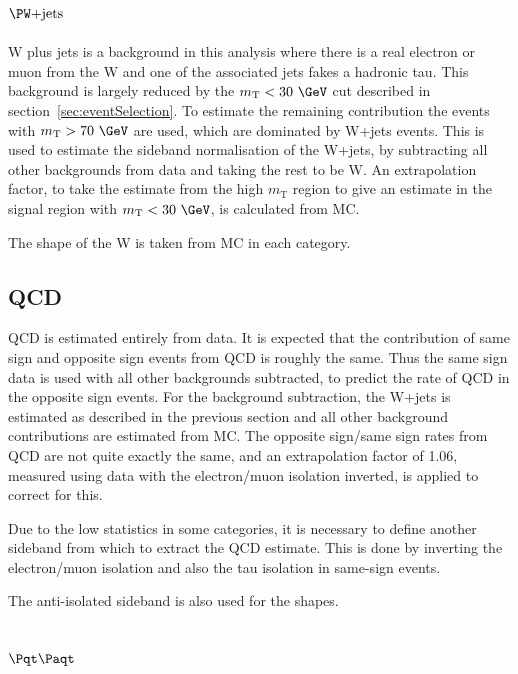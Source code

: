 \subsection{$\WJets$}
\label{sec:backgroundEstimation_WplusJets}

W plus jets is a background in this analysis where there is a real electron or
muon from the W and one of the associated jets fakes a hadronic tau. This
background is largely reduced by the $m_{\text{T}}< 30~\GeV$ cut described in
section~\ref{sec:eventSelection}. To estimate the remaining contribution the
events with $m_{\text{T}}> 70~\GeV$ are used, which are dominated by W+jets 
events. This is used to estimate the sideband normalisation of the W+jets, by
subtracting all other backgrounds from data and taking the rest to be W.
An extrapolation factor, to take the estimate from the high $m_{\text{T}}$ region to
give an estimate in the signal region with $m_{\text{T}}< 30~\GeV$, is calculated from MC.

The shape of the W is taken from MC in each category. 

\subsection{QCD}
\label{sec:backgroundEstimation_QCD}

QCD is estimated entirely from data. It is expected that the contribution of
same sign and opposite sign events from QCD is roughly the same. Thus the same
sign data is used with all other backgrounds subtracted, to predict the rate of
QCD in the opposite sign events. For the background subtraction, the W+jets is
estimated as described in the previous section and all other background
contributions are estimated from MC. The opposite sign/same sign rates from QCD
are not quite exactly the same, and an extrapolation factor of 1.06, measured
using data with the electron/muon isolation inverted, is applied to correct for
this.

Due to the low statistics in some categories, it is necessary to define another
sideband from which to extract the QCD estimate. This is done by inverting the
electron/muon isolation and also the tau isolation in same-sign events. 

The anti-isolated sideband is also used for the shapes.

\subsection{$\ttbar$}
\label{sec:backgroundEstimation_TT}


